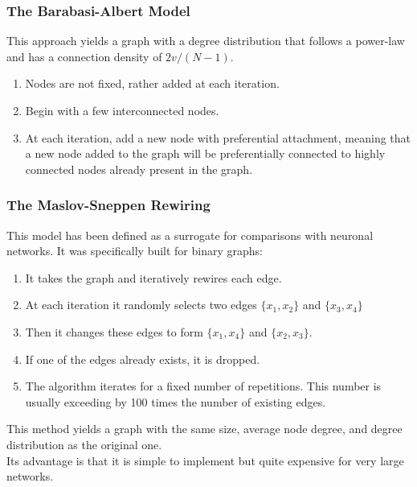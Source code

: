 \subsubsection{The Barabasi-Albert Model}
This approach yields a graph with a degree distribution that follows a power-law and has a connection
density of \(2v/(N-1)\).
\begin{enumerate}
    \item Nodes are not fixed, rather added at each iteration.
    \item Begin with a few interconnected nodes.
    \item At each iteration, add a new node with preferential attachment, meaning that a new node added
          to the graph will be preferentially connected to highly connected nodes already present in the
          graph.
\end{enumerate}
\subsubsection{The Maslov-Sneppen Rewiring}
This model has been defined as a surrogate for comparisons with neuronal networks. It was specifically
built for binary graphs:
\begin{enumerate}
    \item It takes the graph and iteratively rewires each edge.
    \item At each iteration it randomly selects two edges \(\{x_1,x_2\}\) and \(\{x_3,x_4\}\)
    \item Then it changes these edges to form \(\{x_1,x_4\}\) and \(\{x_2,x_3\}\).
    \item If one of the edges already exists, it is dropped.
    \item The algorithm iterates for a fixed number of repetitions. This number is usually exceeding by
          100 times the number of existing edges.
\end{enumerate}
This method yields a graph with the same size, average node degree, and degree distribution as the original one.\\
Its advantage is that it is simple to implement but quite expensive for very large networks.

